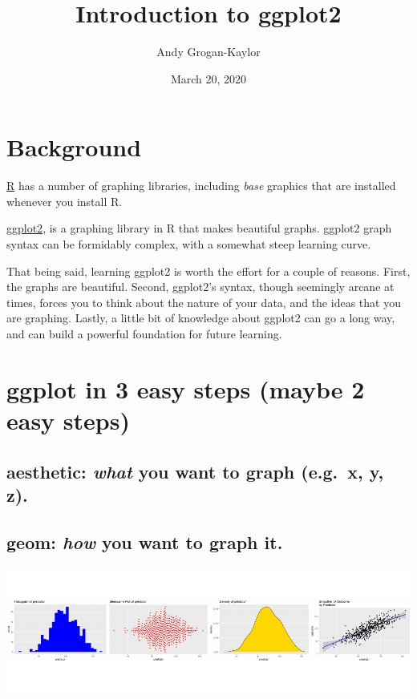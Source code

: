 \documentclass[12pt,]{article}
\title{Introduction to ggplot2}
\author{Andy Grogan-Kaylor}
\date{March 20, 2020}
\begin{document}
\maketitle

{
\setcounter{tocdepth}{3}
\tableofcontents
}
\hypertarget{background}{%
\section{Background}\label{background}}

\href{https://www.r-project.org/foundation/}{R} has a number of graphing
libraries, including \emph{base} graphics that are installed whenever
you install R.

\href{http://ggplot2.org/}{ggplot2}, is a graphing library in R that
makes beautiful graphs. ggplot2 graph syntax can be formidably complex,
with a somewhat steep learning curve.

That being said, learning ggplot2 is worth the effort for a couple of
reasons. First, the graphs are beautiful. Second, ggplot2's syntax,
though seemingly arcane at times, forces you to think about the nature
of your data, and the ideas that you are graphing. Lastly, a little bit
of knowledge about ggplot2 can go a long way, and can build a powerful
foundation for future learning.

\hypertarget{ggplot-in-3-easy-steps-maybe-2-easy-steps}{%
\section{ggplot in 3 easy steps (maybe 2 easy
steps)}\label{ggplot-in-3-easy-steps-maybe-2-easy-steps}}

\hypertarget{aesthetic-what-you-want-to-graph-e.g.x-y-z.}{%
\subsection{\texorpdfstring{\textbf{aesthetic}: \emph{what} you want to
graph (e.g.~x, y,
z).}{aesthetic: what you want to graph (e.g.~x, y, z).}}\label{aesthetic-what-you-want-to-graph-e.g.x-y-z.}}

\hypertarget{geom-how-you-want-to-graph-it.}{%
\subsection{\texorpdfstring{\textbf{geom}: \emph{how} you want to graph
it.}{geom: how you want to graph it.}}\label{geom-how-you-want-to-graph-it.}}

\includegraphics{introduction-to-ggplot2_files/figure-latex/unnamed-chunk-1-1.pdf}
\end{document}

